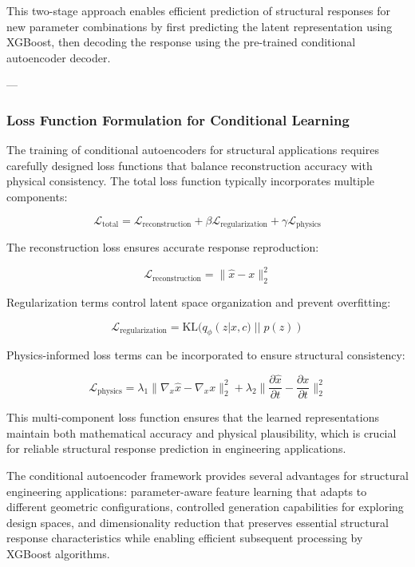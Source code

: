 \documentclass[12pt,a4paper]{report}
\begin{document}
This two-stage approach enables efficient prediction of structural responses for new parameter combinations by first predicting the latent representation using XGBoost, then decoding the response using the pre-trained conditional autoencoder decoder.

---

\subsubsection*{Loss Function Formulation for Conditional Learning}

The training of conditional autoencoders for structural applications requires carefully designed loss functions that balance reconstruction accuracy with physical consistency. The total loss function typically incorporates multiple components:

\begin{equation}
\mathcal{L}_{\text{total}} = \mathcal{L}_{\text{reconstruction}} + \beta \mathcal{L}_{\text{regularization}} + \gamma \mathcal{L}_{\text{physics}}
\end{equation}

The reconstruction loss ensures accurate response reproduction:

\begin{equation}
\mathcal{L}_{\text{reconstruction}} = \|\hat{x} - x\|_2^2
\end{equation}

Regularization terms control latent space organization and prevent overfitting:

\begin{equation}
\mathcal{L}_{\text{regularization}} = \text{KL}(q_{\phi}(z|x,c) \; || \; p(z))
\end{equation}

Physics-informed loss terms can be incorporated to ensure structural consistency:

\begin{equation}
\mathcal{L}_{\text{physics}} = 
\lambda_1 \|\nabla_x \hat{x} - \nabla_x x\|_2^2 
+ \lambda_2 \Big\| \frac{\partial \hat{x}}{\partial t} - \frac{\partial x}{\partial t} \Big\|_2^2
\end{equation}

This multi-component loss function ensures that the learned representations maintain both mathematical accuracy and physical plausibility, which is crucial for reliable structural response prediction in engineering applications.

The conditional autoencoder framework provides several advantages for structural engineering applications: parameter-aware feature learning that adapts to different geometric configurations, controlled generation capabilities for exploring design spaces, and dimensionality reduction that preserves essential structural response characteristics while enabling efficient subsequent processing by XGBoost algorithms.
\end{document}
